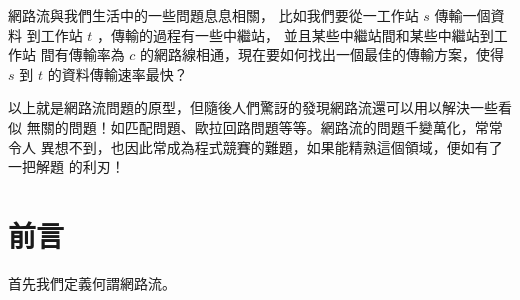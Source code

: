 \documentclass[a4paper,12pt]{book}
\begin{document}
\newcommand{\str}[1]{\texttt{"#1"}}
\newcommand{\mcstr}[2]{\texttt{"#1}\cdots\texttt{#2"}}
\newcommand{\ord}[1]{\opord\left(#1\right)}
\newcommand{\abs}[1]{\lvert #1 \rvert}
\newcommand{\floor}[1]{\lfloor #1 \rfloor}
\newcommand{\ceil}[1]{\lceil #1 \rceil}
\newcommand{\opord}{\operatorname{\mathcal{O}}}
\newcommand{\fail}{\operatorname{\mathcal{F}}}
\newcommand{\flk}{\operatorname{\mathfrak{F}}}
\newcommand{\suf}{\operatorname{\sigma}}
\newcommand{\rank}{\operatorname{\mathcal{R}}}
\newcommand{\sa}{\operatorname{\mathcal{SA}}}
\newcommand{\hei}{\operatorname{\mathcal{H}}}
\newcommand{\edps}{\operatorname{\mathcal{E}}}
\newcommand{\mx}{\operatorname{\mathcal{M}}}
\newcommand{\argmax}{\operatorname{arg\,max}}
\newcommand{\cons}[1]{\left[ \: #1 \: \right]}

\newcommand\numbereqn{\addtocounter{equation}{1}\tag{\theequation}}
\newcommand\listeqn{\hfill\refstepcounter{equation}(\theequation)}
\newenvironment{monobox}{\linespread{0.6}\Verbatim[frame=single, commandchars=\\\{\}]}{\endVerbatim}
\makeatletter


\begin{comment}
  # Definition
  # Maximum s-t Flow algorithms
  # Models
  # Minimum Cost Maximum Flow algorithms
  # Models
  # Feasible flow
  # Models
  # Advanced topic and misc
\end{comment}

網路流與我們生活中的一些問題息息相關， 比如我們要從一工作站 $s$ 傳輸一個資料
到工作站 $t$ ，傳輸的過程有一些中繼站， 並且某些中繼站間和某些中繼站到工作站
間有傳輸率為 $c$ 的網路線相通，現在要如何找出一個最佳的傳輸方案，使得 $s$ 
到 $t$ 的資料傳輸速率最快？ 

以上就是網路流問題的原型，但隨後人們驚訝的發現網路流還可以用以解決一些看似
無關的問題！如匹配問題、歐拉回路問題等等。網路流的問題千變萬化，常常令人
異想不到，也因此常成為程式競賽的難題，如果能精熟這個領域，便如有了一把解題
的利刃！

\section{前言}

首先我們定義何謂網路流。
\end{document}
